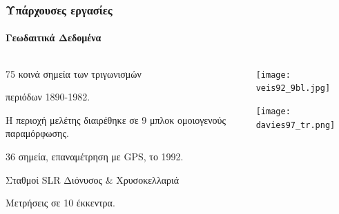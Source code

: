 \begin{frame}
  \frametitle{Υπάρχουσες εργασίες}
  \framesubtitle{Γεωδαιτικά Δεδομένα}
  \label{fr2:pr_geod2}
\begin{columns}
  \begin{column}{.49\textwidth}
    \begin{block}{\textcite{Veis1992}}
    75 κοινά σημεία των τριγωνισμών \par περιόδων 1890-1982.\par
    Η περιοχή μελέτης διαιρέθηκε σε 9 μπλοκ ομοιογενούς παραμόρφωσης.
    \end{block}
    
    \begin{block}{\textcite{Davies199724571}}
    36 σημεία, επαναμέτρηση με GPS, το 1992.\par
    Σταθμοί SLR Διόνυσος \& Χρυσοκελλαριά\par
    Μετρήσεις σε 10 έκκεντρα.
    \end{block}
  \end{column}
  \begin{column}{.49\textwidth}
  \centering
    \texttt{[image: veis92\_9bl.jpg]}

    \texttt{[image: davies97\_tr.png]}

  \end{column}
\end{columns}
\end{frame}
\note{}

